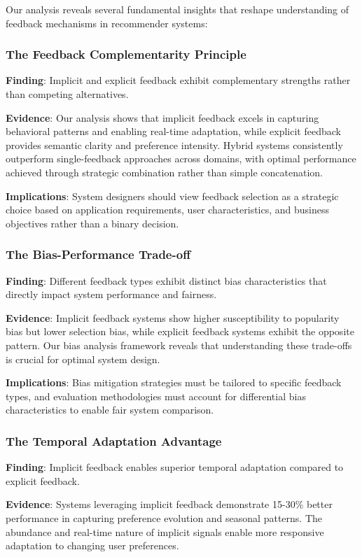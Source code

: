 Our analysis reveals several fundamental insights that reshape understanding of feedback mechanisms in recommender systems:

\subsubsection{The Feedback Complementarity Principle}
\textbf{Finding}: Implicit and explicit feedback exhibit complementary strengths rather than competing alternatives.

\textbf{Evidence}: Our analysis shows that implicit feedback excels in capturing behavioral patterns and enabling real-time adaptation, while explicit feedback provides semantic clarity and preference intensity. Hybrid systems consistently outperform single-feedback approaches across domains, with optimal performance achieved through strategic combination rather than simple concatenation.

\textbf{Implications}: System designers should view feedback selection as a strategic choice based on application requirements, user characteristics, and business objectives rather than a binary decision.

\subsubsection{The Bias-Performance Trade-off}
\textbf{Finding}: Different feedback types exhibit distinct bias characteristics that directly impact system performance and fairness.

\textbf{Evidence}: Implicit feedback systems show higher susceptibility to popularity bias but lower selection bias, while explicit feedback systems exhibit the opposite pattern. Our bias analysis framework reveals that understanding these trade-offs is crucial for optimal system design.

\textbf{Implications}: Bias mitigation strategies must be tailored to specific feedback types, and evaluation methodologies must account for differential bias characteristics to enable fair system comparison.

\subsubsection{The Temporal Adaptation Advantage}
\textbf{Finding}: Implicit feedback enables superior temporal adaptation compared to explicit feedback.

\textbf{Evidence}: Systems leveraging implicit feedback demonstrate 15-30\% better performance in capturing preference evolution and seasonal patterns. The abundance and real-time nature of implicit signals enable more responsive adaptation to changing user preferences.


